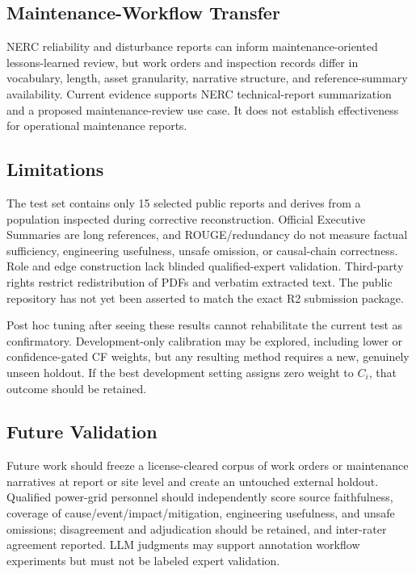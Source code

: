 \documentclass[applsci,article,submit,moreauthors]{Definitions/mdpi}
\begin{document}
\subsection{Maintenance-Workflow Transfer}

NERC reliability and disturbance reports can inform maintenance-oriented lessons-learned review, but work orders and inspection records differ in vocabulary, length, asset granularity, narrative structure, and reference-summary availability. Current evidence supports NERC technical-report summarization and a proposed maintenance-review use case. It does not establish effectiveness for operational maintenance reports.

\subsection{Limitations}

The test set contains only 15 selected public reports and derives from a population inspected during corrective reconstruction. Official Executive Summaries are long references, and ROUGE/redundancy do not measure factual sufficiency, engineering usefulness, unsafe omission, or causal-chain correctness. Role and edge construction lack blinded qualified-expert validation. Third-party rights restrict redistribution of PDFs and verbatim extracted text. The public repository has not yet been asserted to match the exact R2 submission package.

Post hoc tuning after seeing these results cannot rehabilitate the current test as confirmatory. Development-only calibration may be explored, including lower or confidence-gated CF weights, but any resulting method requires a new, genuinely unseen holdout. If the best development setting assigns zero weight to $C_i$, that outcome should be retained.

\subsection{Future Validation}

Future work should freeze a license-cleared corpus of work orders or maintenance narratives at report or site level and create an untouched external holdout. Qualified power-grid personnel should independently score source faithfulness, coverage of cause/event/impact/mitigation, engineering usefulness, and unsafe omissions; disagreement and adjudication should be retained, and inter-rater agreement reported. LLM judgments may support annotation workflow experiments but must not be labeled expert validation.
\end{document}
